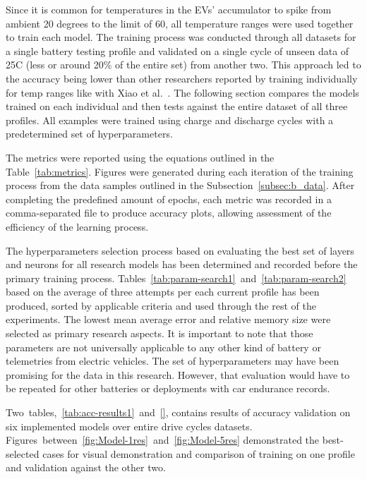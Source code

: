 %
Since it is common for temperatures in the EVs' accumulator to spike from ambient 20 degrees to the limit of 60, all temperature ranges were used together to train each model.
The training process was conducted through all datasets for a single battery testing profile and validated on a single cycle of unseen data of 25\textdegree{}C (less or around 20\% of the entire set) from another two.
This approach led to the accuracy being lower than other researchers reported by training individually for temp ranges like with Xiao et al.~\cite{xiao_accurate_2019}.
The following section compares the models trained on each individual and then tests against the entire dataset of all three profiles.
All examples were trained using charge and discharge cycles with a predetermined set of hyperparameters. %

%
The metrics were reported using the equations outlined in the \mbox{Table~\ref{tab:metrics}}.
Figures were generated during each iteration of the training process from the data samples outlined in the \mbox{Subsection~\ref{subsec:b_data}}.
After completing the predefined amount of epochs, each metric was recorded in a comma-separated file to produce accuracy plots, allowing assessment of the efficiency of the learning process.

%
The hyperparameters selection process based on evaluating the best set of layers and neurons for all research models has been determined and recorded before the primary training process.
\mbox{Tables~\ref{tab:param-search1} and~\ref{tab:param-search2}} based on the average of three attempts per each current profile has been produced, sorted by applicable criteria and used through the rest of the experiments.
The lowest mean average error and relative memory size were selected as primary research aspects.
It is important to note that those parameters are not universally applicable to any other kind of battery or telemetries from electric vehicles.
The set of hyperparameters may have been promising for the data in this research.
However, that evaluation would have to be repeated for other batteries or deployments with car endurance records.

%
%
\mbox{Two tables, \ref{tab:acc-results1} and \ref{}}, contains results of accuracy validation on six implemented models over entire drive cycles datasets.
\mbox{Figures between \ref{fig:Model-1res} and \ref{fig:Model-5res}} demonstrated the best-selected cases for visual demonstration and comparison of training on one profile and validation against the other two.

